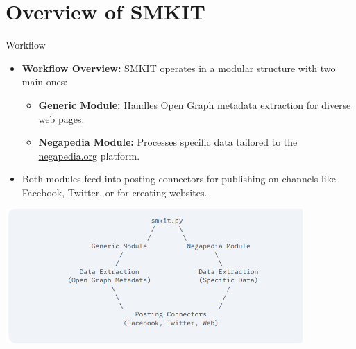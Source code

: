\documentclass{beamer}
\begin{document}
\section{Overview of SMKIT}
    \begin{frame}{Workflow}
        \begin{itemize}
            \item \textbf{Workflow Overview:}
                SMKIT operates in a modular structure with two main ones:
                \begin{itemize}
                    \item \textbf{Generic Module:} Handles Open Graph metadata extraction for diverse web pages.
                    \item \textbf{Negapedia Module:} Processes specific data tailored to the \href{http://www.negapedia.org/}{negapedia.org} platform.
                \end{itemize}
            \item Both modules feed into posting connectors for publishing on channels like Facebook, Twitter, or for creating websites.
        \end{itemize}

        \begin{center}
            \includegraphics[width=0.85\textwidth, keepaspectratio]{images/overview_on_smkit_workflow_slide_image.png}
        \end{center}
    \end{frame}
\end{document}
